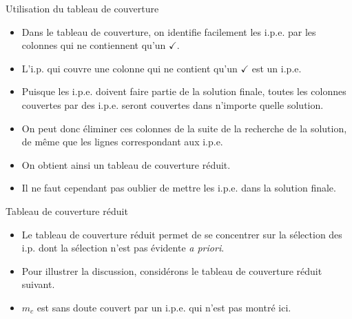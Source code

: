 \documentclass[presentation]{beamer}
\begin{document}
\begin{frame}[label={sec:orge2dedd2}]{Utilisation du tableau de couverture}
\begin{itemize}
\item Dans le tableau de couverture, on identifie facilement les i.p.e. par les colonnes qui ne contiennent qu'un \(\checkmark\).

\item L'i.p. qui couvre une colonne qui ne contient qu'un \(\checkmark\) est un i.p.e.

\item Puisque les i.p.e. doivent faire partie de la solution finale, toutes les colonnes couvertes par des i.p.e. seront couvertes dans n'importe quelle solution.

\item On peut donc éliminer ces colonnes de la suite de la recherche de la solution, de même que les lignes correspondant aux i.p.e.

\item On obtient ainsi un tableau de couverture \alert{réduit}.

\item \alert{Il ne faut cependant pas oublier de mettre les i.p.e. dans la solution finale.}
\end{itemize}
\end{frame}

\begin{frame}[label={sec:orgeb0aef8}]{Tableau de couverture réduit}
\begin{itemize}
\item Le tableau de couverture réduit permet de se concentrer sur la sélection des i.p. dont la sélection n'est pas évidente \emph{a priori}.

\item Pour illustrer la discussion, considérons le tableau de couverture réduit suivant.

\item \(m_c\) est sans doute couvert par un i.p.e. qui n'est pas montré ici.
\end{itemize}
\end{frame}
\end{document}
